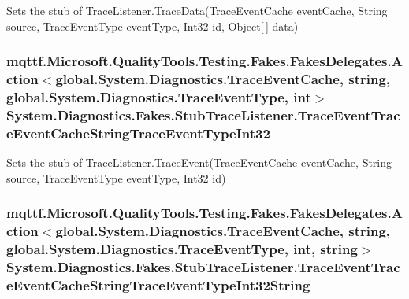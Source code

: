 Sets the stub of Trace\-Listener.\-Trace\-Data(\-Trace\-Event\-Cache event\-Cache, String source, Trace\-Event\-Type event\-Type, Int32 id, Object\mbox{[}$\,$\mbox{]} data)

\hypertarget{class_system_1_1_diagnostics_1_1_fakes_1_1_stub_trace_listener_a9236806d40ca6453171e62f0075ca192}{
\subsubsection[{Trace\-Event\-Trace\-Event\-Cache\-String\-Trace\-Event\-Type\-Int32}]{\setlength{\rightskip}{0pt plus 5cm}mqttf.\-Microsoft.\-Quality\-Tools.\-Testing.\-Fakes.\-Fakes\-Delegates.\-Action$<$global.\-System.\-Diagnostics.\-Trace\-Event\-Cache, string, global.\-System.\-Diagnostics.\-Trace\-Event\-Type, int$>$ System.\-Diagnostics.\-Fakes.\-Stub\-Trace\-Listener.\-Trace\-Event\-Trace\-Event\-Cache\-String\-Trace\-Event\-Type\-Int32}}\label{class_system_1_1_diagnostics_1_1_fakes_1_1_stub_trace_listener_a9236806d40ca6453171e62f0075ca192}


Sets the stub of Trace\-Listener.\-Trace\-Event(\-Trace\-Event\-Cache event\-Cache, String source, Trace\-Event\-Type event\-Type, Int32 id)

\hypertarget{class_system_1_1_diagnostics_1_1_fakes_1_1_stub_trace_listener_ac256f21666d836d5c8272dec51a9218a}{
\subsubsection[{Trace\-Event\-Trace\-Event\-Cache\-String\-Trace\-Event\-Type\-Int32\-String}]{\setlength{\rightskip}{0pt plus 5cm}mqttf.\-Microsoft.\-Quality\-Tools.\-Testing.\-Fakes.\-Fakes\-Delegates.\-Action$<$global.\-System.\-Diagnostics.\-Trace\-Event\-Cache, string, global.\-System.\-Diagnostics.\-Trace\-Event\-Type, int, string$>$ System.\-Diagnostics.\-Fakes.\-Stub\-Trace\-Listener.\-Trace\-Event\-Trace\-Event\-Cache\-String\-Trace\-Event\-Type\-Int32\-String}}\label{class_system_1_1_diagnostics_1_1_fakes_1_1_stub_trace_listener_ac256f21666d836d5c8272dec51a9218a}


